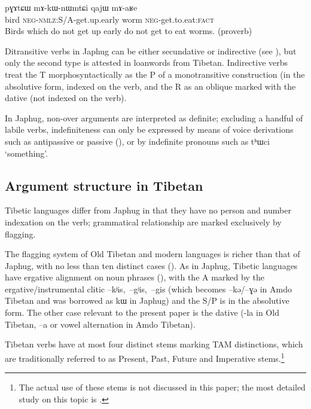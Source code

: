 \documentclass[oldfontcommands,oneside,a4paper,11pt]{article}
\newcommand{\ipa}[1]{{\phon \mbox{#1}}} %
\begin{document}
\begin{exe}
\ex \label{ex:maRe}
\gll
\ipa{pɣɤtɕɯ}  	\ipa{mɤ-kɯ-nɯmtɕi}  	\ipa{qajɯ}  	\ipa{mɤ-aʁe}  \\
bird \textsc{neg-nmlz}:S/A-get.up.early worm \textsc{neg}-get.to.eat:\textsc{fact} \\
\glt Birds which do not get up early do not get to eat worms. (proverb) 
\end{exe}  

Ditransitive verbs in Japhug can be either secundative or indirective (see \citealt{jacques14antipassive}), but only the second type is attested in loanwords from Tibetan. Indirective verbs treat the T morphosyntactically as the P of a monotransitive construction (in the absolutive form, indexed on the verb, and the R as an oblique marked with the dative (not indexed on the verb).

In Japhug, non-over arguments are interpreted as definite; excluding a handful of labile verbs, indefiniteness can only be expressed by means of voice derivations such as antipassive or passive (\citealt{jacques12demotion}), or by indefinite pronouns such as \ipa{tʰɯci} `something'.

\subsection{Argument structure in Tibetan}
Tibetic languages differ from Japhug in that they have no person and number indexation on the verb; grammatical relationship are marked exclusively by flagging.

The flagging system of Old Tibetan and modern languages is richer than that of Japhug,  with no less than ten distinct cases (\citet{tournadre10cases, hill12bas}). As in Japhug, Tibetic languages have ergative alignment on noun phrases (\citealt{tournadre96erg}), with the A marked by the ergative/instrumental clitic \ipa{--kʲis, --gʲis, --gis} (which becomes \ipa{--kə/--ɣə} in Amdo Tibetan and was borrowed as \ipa{kɯ} in Japhug) and the S/P is in the absolutive form. The other case relevant to the present paper is the dative (\ipa{-la} in Old Tibetan, \ipa{--a} or vowel alternation in Amdo Tibetan).


Tibetan verbs have at most four distinct stems marking TAM distinctions, which are traditionally referred to as Present, Past, Future and Imperative stems.\footnote{The actual use of these stems is not discussed in this paper; the most detailed study on this topic is \citealt{zeisler04}.} 
\end{document}
